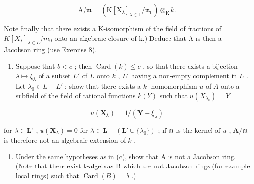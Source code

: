 \[
\mathrm{A} / \mathfrak {m} = (\mathrm{K} [ \mathrm{X} _ {\lambda} ] _ {\lambda \in \mathrm{L}} / \mathfrak {m} _ {0}) \otimes_ {\mathrm{K}} k.
\]

Note finally that there exists a K-isomorphism of the field of fractions of \(K[X_{\lambda}]_{\lambda \in L}/m_{0}\) onto an algebraic closure of k.) Deduce that A is then a Jacobson ring (use Exercise 8).

\begin{enumerate}
\def\labelenumi{(\alph{enumi})}
\setcounter{enumi}{2}
\tightlist
\item
  Suppose that \(b < c\) ; then \(\operatorname{Card}(k) \leqslant c\) , so that there exists a bijection \(\lambda \mapsto \xi_{\lambda}\) of a subset \(L'\) of \(L\) onto \(k\) , \(L'\) having a non-empty complement in \(L\) . Let \(\lambda_0 \in L - L'\) ; show that there exists a \(k\) -homomorphism \(u\) of \(A\) onto a subfield of the field of rational functions \(k(Y)\) such that \(u(X_{\lambda_0}) = Y\) ,
\end{enumerate}

\[
u (\mathbf {X} _ {\lambda}) = 1 / (\mathbf {Y} - \xi_ {\lambda})
\]

for \(\lambda \in \mathbf{L}'\) , \(u(\mathbf{X}_{\lambda}) = 0\) for \(\lambda \in \mathbf{L} - (\mathbf{L}' \cup \{\lambda_0\})\) ; if \(\mathfrak{m}\) is the kernel of \(u\) , \(\mathbf{A} / \mathfrak{m}\) is therefore not an algebraic extension of \(k\) .

\begin{enumerate}
\def\labelenumi{(\alph{enumi})}
\setcounter{enumi}{3}
\tightlist
\item
  Under the same hypotheses as in (c), show that A is not a Jacobson ring. (Note that there exist k-algebras B which are not Jacobson rings (for example local rings) such that \(\operatorname{Card}(B) = b\) .)
\end{enumerate}


